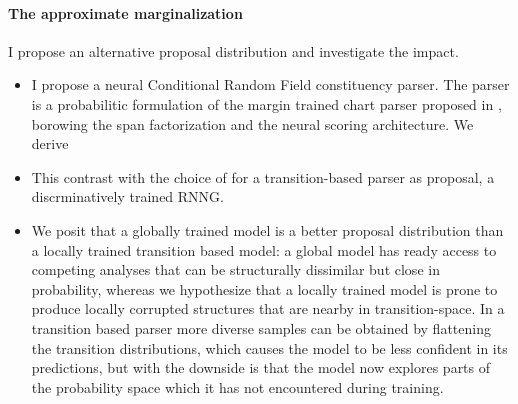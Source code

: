 \paragraph{The approximate marginalization}
  I propose an alternative proposal distribution and investigate the impact.
  \begin{itemize}

    \item I propose a neural Conditional Random Field constituency parser. The parser is a probabilitic formulation of the margin trained chart parser proposed in \citet{stern2017minimal}, borowing the span factorization and the neural scoring architecture. We derive

    \item This contrast with the choice of \citet{dyer2016rnng} for a transition-based parser as proposal, a discrminatively trained RNNG.

    \item We posit that a globally trained model is a better proposal distribution than a locally trained transition based model: a global model has ready access to competing analyses that can be structurally dissimilar but close in probability, whereas we hypothesize that a locally trained model is prone to produce locally corrupted structures that are nearby in transition-space. In a transition based parser more diverse samples can be obtained by flattening the transition distributions, which causes the model to be less confident in its predictions, but with the downside is that the model now explores parts of the probability space which it has not encountered during training.

  \end{itemize}


